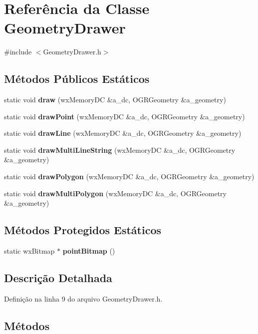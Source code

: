 \section{Referência da Classe Geometry\+Drawer}
\label{class_geometry_drawer}


{\ttfamily \#include $<$Geometry\+Drawer.\+h$>$}

\subsection*{Métodos Públicos Estáticos}
\begin{DoxyCompactItemize}
\item 
static void {\bf draw} (wx\+Memory\+DC \&a\+\_\+dc, O\+G\+R\+Geometry \&a\+\_\+geometry)
\item 
static void {\bf draw\+Point} (wx\+Memory\+DC \&a\+\_\+dc, O\+G\+R\+Geometry \&a\+\_\+geometry)
\item 
static void {\bf draw\+Line} (wx\+Memory\+DC \&a\+\_\+dc, O\+G\+R\+Geometry \&a\+\_\+geometry)
\item 
static void {\bf draw\+Multi\+Line\+String} (wx\+Memory\+DC \&a\+\_\+dc, O\+G\+R\+Geometry \&a\+\_\+geometry)
\item 
static void {\bf draw\+Polygon} (wx\+Memory\+DC \&a\+\_\+dc, O\+G\+R\+Geometry \&a\+\_\+geometry)
\item 
static void {\bf draw\+Multi\+Polygon} (wx\+Memory\+DC \&a\+\_\+dc, O\+G\+R\+Geometry \&a\+\_\+geometry)
\end{DoxyCompactItemize}
\subsection*{Métodos Protegidos Estáticos}
\begin{DoxyCompactItemize}
\item 
static wx\+Bitmap $\ast$ {\bf point\+Bitmap} ()
\end{DoxyCompactItemize}


\subsection{Descrição Detalhada}


Definição na linha 9 do arquivo Geometry\+Drawer.\+h.



\subsection{Métodos}
